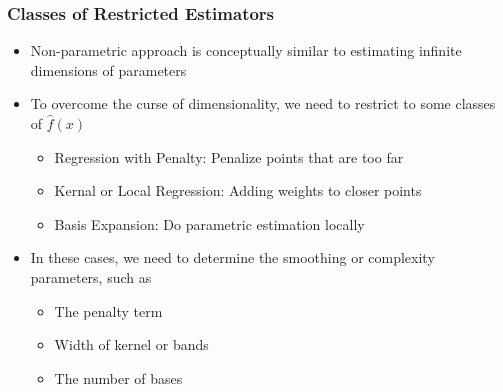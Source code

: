 \documentclass[12pt, xcolor = dvipsnames]{beamer}
\begin{document}
\begin{frame}
\frametitle{Classes of Restricted Estimators}
\begin{itemize}
  \item Non-parametric approach is conceptually similar to estimating infinite dimensions of parameters
  \item To overcome the curse of dimensionality, we need to restrict to some classes of $\hat{f}(x)$
  \begin{itemize}
    \item Regression with Penalty: Penalize points that are too far
    \item Kernal or Local Regression: Adding weights to closer points
    \item Basis Expansion: Do parametric estimation locally
  \end{itemize}
  \item In these cases, we need to determine the smoothing or complexity parameters, such as 
  \begin{itemize}
    \item The penalty term
    \item Width of kernel or bands
    \item The number of bases
  \end{itemize}
\end{itemize}
\end{frame}
\end{document}
